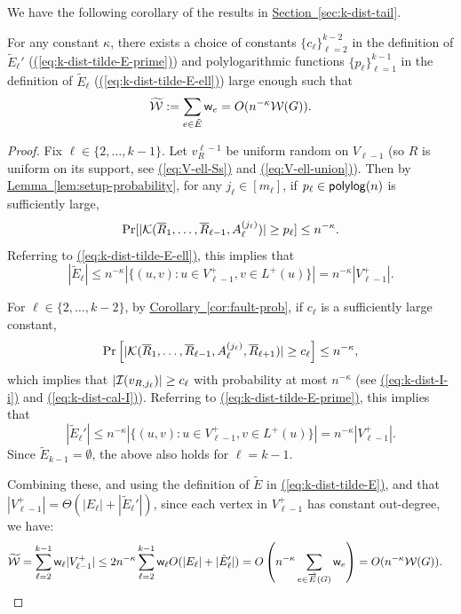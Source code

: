 \documentclass{article}
\newcommand{\eq}[1]{\hyperref[eq:#1]{(\ref*{eq:#1})}}
\renewcommand{\sec}[1]{\hyperref[sec:#1]{Section~\ref*{sec:#1}}}
\newcommand{\lem}[1]{\hyperref[lem:#1]{Lemma~\ref*{lem:#1}}}
\newcommand{\cor}[1]{\hyperref[cor:#1]{Corollary~\ref*{cor:#1}}}
\renewcommand{\>}{\rangle}
\newcommand{\<}{\langle}
\renewcommand{\(}{\left(}
\renewcommand{\)}{\right)}
\def\w{{\sf w}}
\begin{document}
\noindent We have the following corollary of the results in \sec{k-dist-tail}.
\begin{corollary}\label{cor:ktilde-E}
	For any constant $\kappa$, there exists a choice of constants $\{c_{\ell}\}_{\ell=2}^{k-2}$ in the definition of $\tilde{E}_{\ell}'$ (\eq{k-dist-tilde-E-prime}) and polylogarithmic functions $\{p_{\ell}\}_{\ell=1}^{k-1}$ in the definition of $\tilde{E}_{\ell}$ (\eq{k-dist-tilde-E-ell}) large enough such that 
	$$\widetilde{\cal W} := \sum_{e\in \tilde{E}}\w_e = O(n^{-\kappa}{\cal W}(G)).$$ 
\end{corollary}
\begin{proof}
Fix $\ell\in\{2,\dots,k-1\}$.
Let $v_R^{\ell-1}$ be uniform random on $V_{\ell-1}$ (so $R$ is uniform on its support, see \eq{V-ell-Ss} and \eq{V-ell-union}). Then by \lem{setup-probability}, for any $j_{\ell}\in [m_{\ell}]$, if $p_{\ell}\in{\sf polylog}(n)$ is sufficiently large, 
\begin{equation}
\Pr[|{\cal K}(\overline{R}_1,\dots,\overline{R}_{\ell-1},A_{\ell}^{(j_{\ell})})|\geq p_{\ell}]\leq n^{-\kappa}.\label{eq:k-dist-pl}
\end{equation}
Referring to \eq{k-dist-tilde-E-ell}, this implies that 
$$|\tilde{E}_{\ell}|\leq n^{-\kappa}|\{(u,v):u\in V_{\ell-1}^+, v\in L^+(u)\}|=n^{-\kappa}|V_{\ell-1}^+|.$$

For $\ell\in\{2,\dots,k-2\}$, by \cor{fault-prob}, if $c_{\ell}$ is a sufficiently large constant,  
$$\Pr\left[|{\cal K}(\overline{R}_1,\dots,\overline{R}_{\ell-1},A_{\ell}^{(j_{\ell})},\overline{R}_{\ell+1})| \geq c_{\ell} \right]\leq n^{-\kappa},$$
which implies that $|{\cal I}(v_{R,j_{\ell}})|\geq c_{\ell}$ with probability at most $n^{-\kappa}$ (see \eq{k-dist-I-i} and \eq{k-dist-cal-I}). 
Referring to \eq{k-dist-tilde-E-prime}, this implies that
$$|\tilde{E}_{\ell}'|\leq n^{-\kappa}|\{(u,v):u\in V_{\ell-1}^+, v\in L^+(u)\}|=n^{-\kappa}|V_{\ell-1}^+|.$$
Since $\tilde{E}_{k-1}=\emptyset$, the above also holds for $\ell=k-1$.

Combining these, and using
the definition of $\tilde{E}$ in \eq{k-dist-tilde-E},
and that $|V_{\ell-1}^+|=\Theta(|E_{\ell}|+|\tilde{E}_{\ell}'|)$, since each vertex in $V_{\ell-1}^+$ has constant out-degree,
we have:
\begin{align*}
\widetilde{\cal W} &= \sum_{\ell=2}^{k-1}\w_{\ell}|V_{\ell-1}^+|
\leq 2n^{-\kappa}\sum_{\ell=2}^{k-1}\w_{\ell}O(|E_{\ell}|+|\tilde{E}_{\ell}'|) 
=O\left(n^{-\kappa}\sum_{e\in\overrightarrow{E}(G)}\w_{e}\right)
= O(n^{-\kappa}{\cal W}(G)).\qedhere
\end{align*}
\end{proof}
\end{document}
